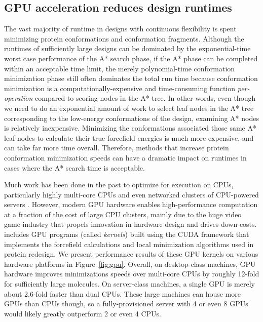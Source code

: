 
\subsection{GPU acceleration reduces design runtimes}

The vast majority of \osprey runtime in designs with continuous flexibility is spent minimizing protein conformations and conformation fragments. Although the runtimes of sufficiently large designs can be dominated by the exponential-time worst case performance of the A* search phase, if the A* phase can be completed within an acceptable time limit, the merely polynomial-time conformation minimization phase still often dominates the total run time because conformation minimization is a computationally-expensive and time-consuming function {\it per-operation} compared to scoring nodes in the A* tree. In other words, even though we need to do an exponential amount of work to select leaf nodes in the A* tree corresponding to the low-energy conformations of the design, examining A* nodes is relatively inexpensive. Minimizing the conformations associated those same A* leaf nodes to calculate their true forcefield energies is much more expensive, and can take far more time overall. Therefore, methods that increase protein conformation minimization speeds can have a dramatic impact on \osprey runtimes in cases where the A* search time is acceptable.

Much work has been done in the past to optimize \osprey for execution on CPUs, particularly highly multi-core CPUs and even networked clusters of CPU-powered servers . However, modern GPU hardware enables high-performance computation at a fraction of the cost of large CPU clusters, mainly due to the huge video game industry that propels innovation in hardware design and drives down costs.  includes GPU programs (called {\it kernels}) built using the CUDA framework that implements the forcefield calculations and local minimization algorithms used in protein redesign. We present performance results of these GPU kernels on various hardware platforms in Figure~\ref{fig:gpu}. Overall, on desktop-class machines, GPU hardware improves minimizations speeds over multi-core CPUs by roughly 12-fold for sufficiently large molecules. On server-class machines, a single GPU is merely about 2.6-fold faster than dual CPUs. These large machines can house more GPUs than CPUs though, so a fully-provisioned server with 4 or even 8 GPUs would likely greatly outperform 2 or even 4 CPUs. 

